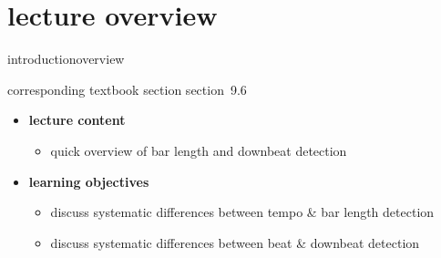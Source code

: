 


\subtitle{Module 9.6: Downbeat and Bar Length Detection}


	

    \section[overview]{lecture overview}
        \begin{frame}{introduction}{overview}
            \begin{block}{corresponding textbook section}
                    section~9.6
            \end{block}

            \begin{itemize}
                \item   \textbf{lecture content}
                    \begin{itemize}
                        \item   quick overview of bar length and downbeat detection
                    \end{itemize}
                \bigskip
                \item<2->   \textbf{learning objectives}
                    \begin{itemize}
                        \item   discuss systematic differences between tempo \& bar length detection
                        \item   discuss systematic differences between beat \& downbeat detection
                    \end{itemize}
            \end{itemize}
        \end{frame}

